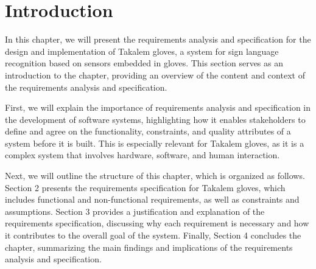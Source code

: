 \section{Introduction}
In this chapter, we will present the requirements analysis and specification for the design and implementation of Takalem gloves, a system for sign language recognition based on sensors embedded in gloves. This section serves as an introduction to the chapter, providing an overview of the content and context of the requirements analysis and specification.

First, we will explain the importance of requirements analysis and specification in the development of software systems, highlighting how it enables stakeholders to define and agree on the functionality, constraints, and quality attributes of a system before it is built. This is especially relevant for Takalem gloves, as it is a complex system that involves hardware, software, and human interaction.

Next, we will outline the structure of this chapter, which is organized as follows. Section 2 presents the requirements specification for Takalem gloves, which includes functional and non-functional requirements, as well as constraints and assumptions. Section 3 provides a justification and explanation of the requirements specification, discussing why each requirement is necessary and how it contributes to the overall goal of the system. Finally, Section 4 concludes the chapter, summarizing the main findings and implications of the requirements analysis and specification.